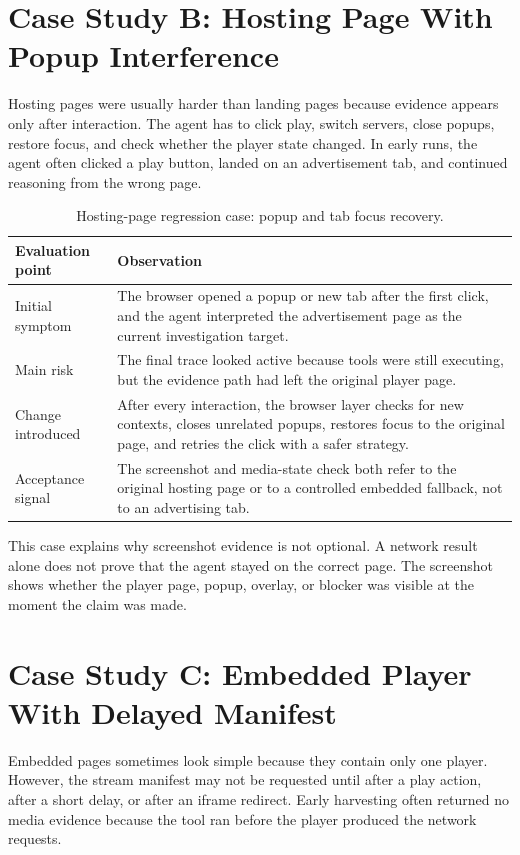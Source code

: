 \section{Case Study B: Hosting Page With Popup Interference}

Hosting pages were usually harder than landing pages because evidence appears
only after interaction. The agent has to click play, switch servers, close
popups, restore focus, and check whether the player state changed. In early
runs, the agent often clicked a play button, landed on an advertisement tab, and
continued reasoning from the wrong page.

\begin{table}[!htbp]
\centering
\begin{tabularx}{\textwidth}{Q{3.8cm}Y}
\toprule
{}
Evaluation point & Observation \\
\midrule
Initial symptom & The browser opened a popup or new tab after the first click,
and the agent interpreted the advertisement page as the current investigation
target. \\
Main risk & The final trace looked active because tools were still executing,
but the evidence path had left the original player page. \\
Change introduced & After every interaction, the browser layer checks for new
contexts, closes unrelated popups, restores focus to the original page, and
retries the click with a safer strategy. \\
Acceptance signal & The screenshot and media-state check both refer to the
original hosting page or to a controlled embedded fallback, not to an
advertising tab. \\
\bottomrule
\end{tabularx}
\caption{Hosting-page regression case: popup and tab focus recovery.}
\label{tab:case-hosting-popup}
\end{table}

This case explains why screenshot evidence is not optional. A network result
alone does not prove that the agent stayed on the correct page. The screenshot
shows whether the player page, popup, overlay, or blocker was visible at the
moment the claim was made.

\section{Case Study C: Embedded Player With Delayed Manifest}

Embedded pages sometimes look simple because they contain only one player.
However, the stream manifest may not be requested until after a play action,
after a short delay, or after an iframe redirect. Early harvesting often
returned no media evidence because the tool ran before the player produced the
network requests.

